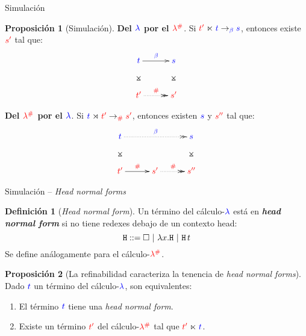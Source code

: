 \documentclass{beamer}
\theoremstyle{definition}
\newtheorem{defes}{Definición}
\newtheorem{proes}{Proposición}
\newcommand{\cLam}[1]{{\color{darkBlue} #1}}
\newcommand{\cDist}[1]{{\color{red} #1}}
\newcommand{\clambdadist}{\cDist{\lambdadist}}
\newcommand{\clambda}{\cLam{\lambda}}
\begin{document}
\begin{frame}{Simulación}
\begin{proes}[Simulación]
\textbf{Del $\clambda$ por el $\clambdadist$}.
Si $\cDist{\tm'} \refines \cLam{\tm} \to_{\cLam{\beta}} \cLam{\tmtwo}$,
entonces existe $\cDist{\tmtwo'}$ tal que:
\[
\xymatrix@=1cm{
 \cLam{\tm} \ar@{}[d]|*=0[@]{\rtimes} \ar[r]^{\cLam{\beta}} & \cLam{\tmtwo} \ar@{}[d]|*=0[@]{\rtimes} \\
 \cDist{\tm'} \ar@{.>>}[r]^{\cDist{\dist}} & \cDist{\tmtwo'} \\
}
\]

\textbf{Del $\clambdadist$ por el $\clambda$}.
Si $\cLam{\tm} \refinedby \cDist{\tm'} \to_{\cDist{\dist}} \cDist{\tmtwo'}$,
entonces existen $\cLam{\tmtwo}$ y $\cDist{\tmtwo''}$ tal que:
\[
\xymatrix@=1cm{
 \cLam{\tm} \ar@{}[d]|*=0[@]{\rtimes} \ar@{.>>}[rr]^{\cLam{\beta}} & & \cLam{\tmtwo} \ar@{}[d]|*=0[@]{\rtimes} \\
 \cDist{\tm'} \ar[r]^{\cDist{\dist}} & \cDist{\tmtwo'} \ar@{.>>}[r]^{\cDist{\dist}} & \cDist{\tmtwo''} \\
}
\]
\end{proes}
\end{frame}

\begin{frame}{Simulación -- \emph{Head normal forms}}
\begin{defes}[\emph{Head normal form}]
  Un término del cálculo-$\clambda$ está en \textbf{\emph{head normal form}} si no tiene redexes debajo de un contexto head:
\[ \mathtt{H} ::= \Box \ | \ \lambda x. \mathtt{H} \ | \ \mathtt{H}\, t \]
Se define análogamente para el cálculo-$\clambdadist$.
\end{defes}

\begin{proes}[{\footnotesize La refinabilidad caracteriza la tenencia de \emph{head normal forms}}]
  Dado $\cLam{t}$ un término del cálculo-$\clambda$, son equivalentes:
\begin{enumerate}
\item El término $\cLam{t}$ tiene una \emph{head normal form}.
\item Existe un término $\cDist{t'}$ del cálculo-$\clambdadist$ tal que $\cDist{t'} \refines \cLam{t}$.
\end{enumerate}
\end{proes}
\end{frame}
\end{document}
